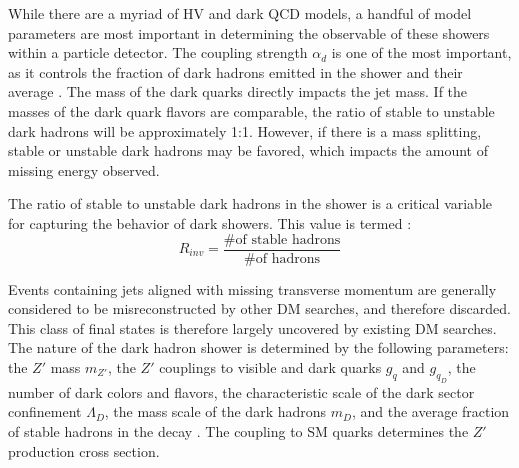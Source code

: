 While there are a myriad of HV and dark QCD models, a handful of model parameters are most important in determining the observable of these showers within a particle detector. The coupling strength $\alpha_d$ is one of the most important, as it controls the fraction of dark hadrons emitted in the shower and their average \pt. The mass of the dark quarks directly impacts the jet mass. If the masses of the dark quark flavors are comparable, the ratio of stable to unstable dark hadrons will be approximately 1:1. However, if there is a mass splitting, stable or unstable dark hadrons may be favored, which impacts the amount of missing energy observed. \par

The ratio of stable to unstable dark hadrons in the shower is a critical variable for capturing the behavior of dark showers. This value is termed \rinv:
\begin{equation}
	R_{inv} = \frac{\textrm{\# of stable hadrons}}{\textrm{\# of hadrons}}
\end{equation}

Events containing jets aligned with missing transverse momentum are generally considered to be misreconstructed by other DM searches, and therefore discarded. This class of final states is therefore largely uncovered by existing DM searches. The nature of the dark hadron shower is determined by the following parameters: the $Z'$ mass $m_{Z'}$, the $Z'$ couplings to visible and dark quarks $g_q$ and $g_{q_D}$, the number of dark colors and flavors, the characteristic scale of the dark sector confinement $\Lambda_D$, the mass scale of the dark hadrons $m_D$, and the average fraction of stable hadrons in the decay \rinv. The coupling to SM quarks determines the $Z'$ production cross section.

